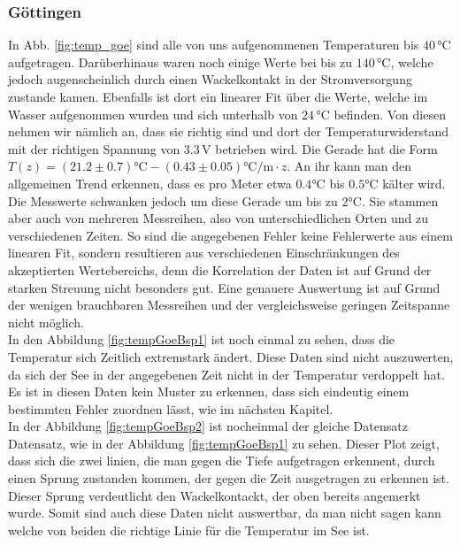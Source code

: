 \documentclass[12pt,a4paper,titlepage,headinclude,bibtotoc]{scrartcl}
\numberwithin{equation}{subsection}
\begin{document}
\subsubsection{Göttingen}
In Abb. \ref{fig:temp_goe} sind alle von uns aufgenommenen Temperaturen bis $40\,\si{\celsius}$ aufgetragen.
Darüber\-hinaus waren noch einige Werte bei bis zu $140\,\si{\celsius}$, welche jedoch augenscheinlich durch einen Wackelkontakt in der Stromversorgung zustande kamen.
Ebenfalls ist dort ein linearer Fit über die Werte, welche im Wasser aufgenommen wurden und sich unterhalb von $24\,\si{\celsius}$ befinden.
Von diesen nehmen wir nämlich an, dass sie richtig sind und dort der Temperaturwiderstand mit der richtigen Spannung von $3.3\,$V betrieben wird.
Die Gerade hat die Form $T(z)=(21.2\pm 0.7)\si{\celsius}-(0.43\pm 0.05)\si{\celsius\per\meter}\cdot z$.
An ihr kann man den allgemeinen Trend erkennen, dass es pro Meter etwa $0.4\si{\celsius}$ bis  $0.5\si{\celsius}$  kälter wird.
Die Messwerte schwanken jedoch um diese Gerade um bis zu $2\si{\celsius}$.
Sie stammen aber auch von mehreren Messreihen, also von unterschiedlichen Orten und zu verschiedenen Zeiten.
So sind die angegebenen Fehler keine Fehlerwerte aus einem linearen Fit, sondern resultieren aus verschiedenen Einschränkungen des akzeptierten Wertebereichs, denn die Korrelation der Daten ist auf Grund der starken Streuung nicht besonders gut.
Eine genauere Auswertung ist auf Grund der wenigen brauchbaren Messreihen und der vergleichsweise geringen Zeitspanne nicht möglich.\\
In den Abbildung \ref{fig:tempGoeBsp1} ist noch einmal zu sehen, dass die Temperatur sich Zeitlich extremstark ändert.
Diese Daten sind nicht auszuwerten, da sich der See in der angegebenen Zeit nicht in der Temperatur verdoppelt hat.
Es ist in diesen Daten kein Muster zu erkennen, dass sich eindeutig einem bestimmten Fehler zuordnen lässt, wie im nächsten Kapitel.\\
In der Abbildung \ref{fig:tempGoeBsp2} ist nocheinmal der gleiche Datensatz Datensatz, wie in der Abbildung \ref{fig:tempGoeBsp1} zu sehen.
Dieser Plot zeigt, dass sich die zwei linien, die man gegen die Tiefe aufgetragen erkennent, durch einen Sprung zustanden kommen, der gegen die Zeit ausgetragen zu erkennen ist.
Dieser Sprung verdeutlicht den Wackelkontackt, der oben bereits angemerkt wurde.
Somit sind auch diese Daten nicht auswertbar, da man nicht sagen kann welche von beiden die richtige Linie für die Temperatur im See ist.\\
\end{document}
